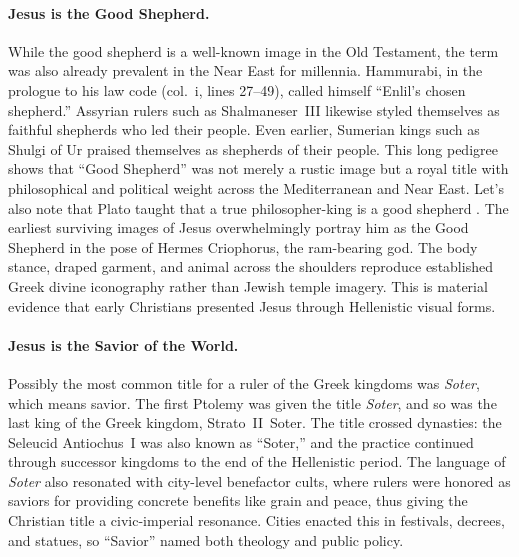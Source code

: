 \paragraph{Jesus is the Good Shepherd.}\label{par:jesus-is-the-good-shepherd.}
While the good shepherd is a well-known image in the Old Testament, the term was also already prevalent in the Near East for millennia.
Hammurabi, in the prologue to his law code (col.~i, lines 27--49), called himself ``Enlil's chosen shepherd.''
Assyrian rulers such as Shalmaneser~III likewise styled themselves as faithful shepherds who led their people.
Even earlier, Sumerian kings such as Shulgi of Ur praised themselves as shepherds of their people.
This long pedigree shows that “Good Shepherd” was not merely a rustic image but a royal title with philosophical and political weight across the Mediterranean and Near East.
Let's also note that Plato taught that a true philosopher-king is a good shepherd \cite[275b--c]{plato:statesman}.
The earliest surviving images of Jesus overwhelmingly portray him as the Good Shepherd in the pose of Hermes Criophorus, the ram-bearing god.
The body stance, draped garment, and animal across the shoulders reproduce established Greek divine iconography rather than Jewish temple imagery.
This is material evidence that early Christians presented Jesus through Hellenistic visual forms.

\paragraph{Jesus is the Savior of the World.}\label{par:jesus-is-the-savior-of-the-world.}
Possibly the most common title for a ruler of the Greek kingdoms was \emph{Soter}, which means savior.
The first Ptolemy was given the title \emph{Soter}, and so was the last king of the Greek kingdom, Strato~II~Soter.
The title crossed dynasties: the Seleucid Antiochus~I was also known as ``Soter,'' and the practice continued through successor kingdoms to the end of the Hellenistic period.
The language of \emph{Soter} also resonated with city-level benefactor cults, where rulers were honored as saviors for providing concrete benefits like grain and peace, thus giving the Christian title a civic-imperial resonance.
Cities enacted this in festivals, decrees, and statues, so “Savior” named both theology and public policy.


